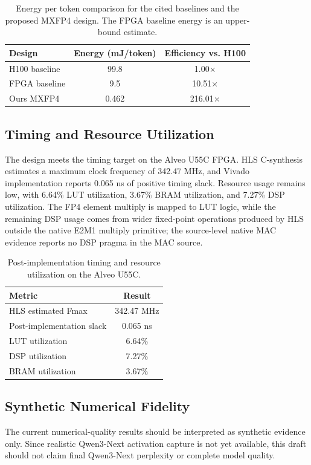 \documentclass[conference]{IEEEtran}
\begin{document}
\begin{table}[t]
\centering
\caption{Energy per token comparison for the cited baselines and the proposed MXFP4 design. The FPGA baseline energy is an upper-bound estimate.}
\label{tab:energy_results}
\scriptsize
\setlength{\tabcolsep}{4pt}
\renewcommand{\arraystretch}{0.92}
\begin{tabular}{lcc}
\hline
Design & Energy (mJ/token) & Efficiency vs. H100 \\
\hline
H100 baseline & 99.8 & 1.00$\times$ \\
FPGA baseline & 9.5 & 10.51$\times$ \\
Ours MXFP4 & 0.462 & 216.01$\times$ \\
\hline
\end{tabular}
\end{table}

\subsection{Timing and Resource Utilization}
The design meets the timing target on the Alveo U55C FPGA. HLS C-synthesis estimates a maximum clock frequency of 342.47 MHz, and Vivado implementation reports 0.065 ns of positive timing slack. Resource usage remains low, with 6.64\% LUT utilization, 3.67\% BRAM utilization, and 7.27\% DSP utilization. The FP4 element multiply is mapped to LUT logic, while the remaining DSP usage comes from wider fixed-point operations produced by HLS outside the native E2M1 multiply primitive; the source-level native MAC evidence reports no DSP pragma in the MAC source.


\begin{table}[t]
\centering
\caption{Post-implementation timing and resource utilization on the Alveo U55C.}
\label{tab:resource_results}
\scriptsize
\setlength{\tabcolsep}{4pt}
\renewcommand{\arraystretch}{0.92}
\begin{tabular}{lc}
\hline
Metric & Result \\
\hline
HLS estimated Fmax & 342.47 MHz \\
Post-implementation slack & 0.065 ns \\
LUT utilization & 6.64\% \\
DSP utilization & 7.27\% \\
BRAM utilization & 3.67\% \\
\hline
\end{tabular}
\end{table}

\subsection{Synthetic Numerical Fidelity}
The current numerical-quality results should be interpreted as synthetic evidence only. Since realistic Qwen3-Next activation capture is not yet available, this draft should not claim final Qwen3-Next perplexity or complete model quality.
\end{document}
